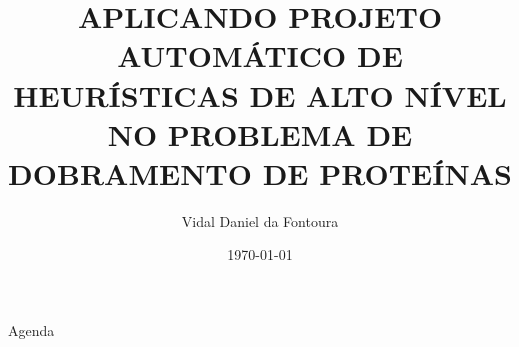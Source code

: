 

\title[Short title]{\textbf{APLICANDO PROJETO AUTOMÁTICO DE HEURÍSTICAS
		DE ALTO NÍVEL NO PROBLEMA DE DOBRAMENTO DE
		PROTEÍNAS}} %

\author{Vidal Daniel da Fontoura} 

\date{\today} %


\frame{
	\titlepage
}

\begin{frame}[allowframebreaks]{Agenda}	


   \hspace*{1cm}
		\vspace{-30pt}
		\tableofcontents
\end{frame}